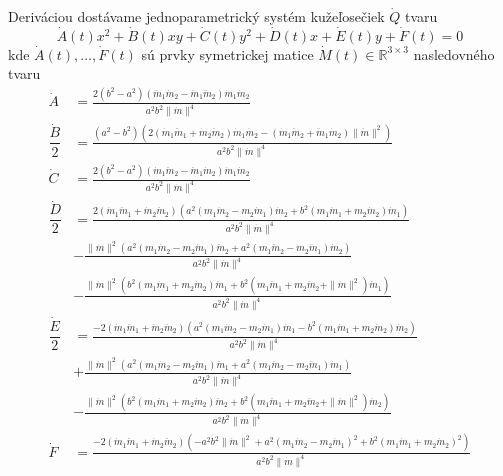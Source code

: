 Deriváciou dostávame jednoparametrický systém kužeľosečiek $\dot{Q}$ tvaru 
$$
\dot{A}(t)x^2 + \dot{B}(t)xy + \dot{C}(t)y^2 + \dot{D}(t)x + \dot{E}(t)y + \dot{F}(t) = 0$$
kde $\dot{A}(t), \dots, \dot{F}(t)$ sú prvky symetrickej matice $\dot{M}(t) \in \mathbb{R}^{3 \times 3}$ nasledovného tvaru
\begin{align*}
\dot{A} &= \frac{2 ( b^2 - a^{2}) ( \ddot{m}_{1} \dot{m}_{2} - \dot{m}_{1} \ddot{m}_{2}) \dot{m}_{1} \dot{m}_{2}}{a^{2} b^{2} \|\dot{m} \|^4} \\
\dfrac{\dot{B}}{2} &= \frac{(a^{2} - b^{2}) (2 (\dot{m}_{1} \ddot{m}_{1} + \dot{m}_{2} \ddot{m}_{2}) \dot{m}_{1} \dot{m}_{2} - (\dot{m}_{1} \ddot{m}_{2} + \ddot{m}_{1} \dot{m}_{2}) \|\dot{m} \|^2)}{a^{2} b^{2} \|\dot{m} \|^4} \\
\dot{C} &= \frac{2 (b^2 - a^{2}) ( \dot{m}_{1} \ddot{m}_{2} - \ddot{m}_{1} \dot{m}_{2}) \dot{m}_{1} \dot{m}_{2}}{a^{2} b^{2} \|\dot{m} \|^4} \\
\dfrac{\dot{D}}{2} &= \frac{2(\dot{m}_{1} \ddot{m}_{1} + \dot{m}_{2} \ddot{m}_{2}) (a^{2} (m_{1} \dot{m}_{2} - m_{2} \dot{m}_{1}) \dot{m}_{2} + b^{2} (m_{1} \dot{m}_{1} + m_{2} \dot{m}_{2}) \dot{m}_{1})}{a^{2} b^{2} \|\dot{m} \|^4} \\
&- \frac{\|\dot{m} \|^2 (a^{2}(m_{1} \dot{m}_{2} - m_{2} \dot{m}_{1}) \ddot{m}_{2} + a^2 (m_{1} \ddot{m}_{2} - m_{2} \ddot{m}_{1}) \dot{m}_{2})}{a^{2} b^{2} \|\dot{m} \|^4} \\
&- \frac{\|\dot{m} \|^2 ( b^{2}(m_{1} \dot{m}_{1} + m_{2} \dot{m}_{2}) \ddot{m}_{1} + b^2 (m_{1} \ddot{m}_{1} + m_{2} \ddot{m}_{2} + \|\dot{m} \|^2) \dot{m}_{1})}{a^{2} b^{2} \|\dot{m} \|^4} \\
\dfrac{\dot{E}}{2} &= \frac{- 2 (\dot{m}_{1} \ddot{m}_{1} + \dot{m}_{2} \ddot{m}_{2}) (a^{2} (m_{1} \dot{m}_{2} - m_{2} \dot{m}_{1}) \dot{m}_{1} - b^{2} (m_{1} \dot{m}_{1} + m_{2} \dot{m}_{2}) \dot{m}_{2})}{a^{2} b^{2} \|\dot{m} \|^4} \\
&+ \frac{\|\dot{m} \|^2 (a^{2} (m_{1} \dot{m}_{2} - m_{2} \dot{m}_{1}) \ddot{m}_{1} + a^{2} (m_{1} \ddot{m}_{2} - m_{2} \ddot{m}_{1}) \dot{m}_{1})}{a^{2} b^{2} \|\dot{m} \|^4} \\
&- \frac{\|\dot{m} \|^2 (b^{2} (m_{1} \dot{m}_{1} + m_{2} \dot{m}_{2}) \ddot{m}_{2} + b^{2} (m_{1} \ddot{m}_{1} + m_{2} \ddot{m}_{2} + \|\dot{m} \|^2) \dot{m}_{2})}{a^{2} b^{2} \|\dot{m} \|^4} \\
\dot{F} &= \frac{-2(\dot{m}_{1} \ddot{m}_{1} + \dot{m}_{2} \ddot{m}_{2}) (- a^{2} b^{2} \|\dot{m} \|^2 + a^{2} (m_{1}\dot{m}_{2} - m_{2}\dot{m}_{1})^2 + b^{2} (m_{1} \dot{m}_{1} + m_{2} \dot{m}_{2})^{2})}{a^{2} b^{2} \|\dot{m} \|^4} \\

\end{align*}
